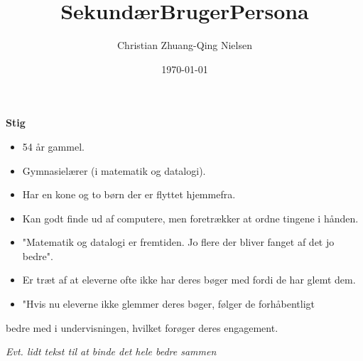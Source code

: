 \documentclass[11pt]{article}
\author{Christian Zhuang-Qing Nielsen}
\date{\today}
\title{SekundærBrugerPersona}
\begin{document}
\maketitle
\tableofcontents

\textbf{Stig}

\begin{itemize}
\item 54 år gammel.
\item Gymnasielærer (i matematik og datalogi).
\item Har en kone og to børn der er flyttet hjemmefra.
\item Kan godt finde ud af computere, men foretrækker at ordne tingene i hånden.
\item "Matematik og datalogi er fremtiden. Jo flere der bliver fanget af det jo bedre".
\item Er træt af at eleverne ofte ikke har deres bøger med fordi de har glemt dem.
\item "Hvis nu eleverne ikke glemmer deres bøger, følger de forhåbentligt
\end{itemize}
bedre med i undervisningen, hvilket forøger deres engagement.

\emph{Evt. lidt tekst til at binde det hele bedre sammen}
\end{document}
